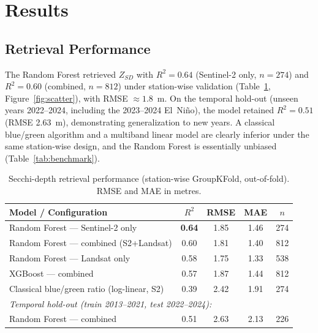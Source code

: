 \documentclass[remotesensing,article,submit,pdftex,moreauthors]{Definitions/mdpi}
\begin{document}
\section{Results}
\subsection{Retrieval Performance}
The Random Forest retrieved $Z_{SD}$ with $R^2=0.64$ (Sentinel-2 only, $n=274$) and
$R^2=0.60$ (combined, $n=812$) under station-wise validation
(Table~\ref{tab:perf}, Figure~\ref{fig:scatter}), with RMSE $\approx1.8$~m. On the
temporal hold-out (unseen years 2022--2024, including the 2023--2024 El~Ni\~no), the
model retained $R^2=0.51$ (RMSE 2.63~m), demonstrating generalization to new years.
A classical blue/green algorithm and a multiband linear model are clearly inferior
under the same station-wise design, and the Random Forest is essentially unbiased
(Table~\ref{tab:benchmark}).

\begin{table}[H]
\caption{Secchi-depth retrieval performance (station-wise GroupKFold, out-of-fold).
RMSE and MAE in metres.\label{tab:perf}}
\begin{tabularx}{\textwidth}{Xcccc}
\toprule
\textbf{Model / Configuration} & \textbf{$R^2$} & \textbf{RMSE} & \textbf{MAE} & \textbf{$n$} \\
\midrule
Random Forest --- Sentinel-2 only        & \textbf{0.64} & 1.85 & 1.46 & 274 \\
Random Forest --- combined (S2+Landsat)  & 0.60 & 1.81 & 1.40 & 812 \\
Random Forest --- Landsat only           & 0.58 & 1.75 & 1.33 & 538 \\
XGBoost --- combined                     & 0.57 & 1.87 & 1.44 & 812 \\
Classical blue/green ratio (log-linear, S2) & 0.39 & 2.42 & 1.91 & 274 \\
\midrule
\multicolumn{5}{l}{\emph{Temporal hold-out (train 2013--2021, test 2022--2024):}}\\
Random Forest --- combined               & 0.51 & 2.63 & 2.13 & 226 \\
\bottomrule
\end{tabularx}
\end{table}
\end{document}

